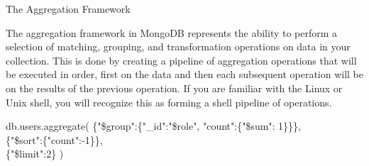 \documentclass{beamer}
\begin{document}
\begin{frame}{The Aggregation Framework}

   	The aggregation framework in MongoDB represents the ability to perform a selection of matching, grouping,
   	and transformation operations on data in your collection. This is done by creating a pipeline of aggregation
   	operations that will be executed in order, first on the data and then each subsequent operation will be on the
   	results of the previous operation. If you are familiar with the Linux or Unix shell, you will recognize this as
   	forming a shell pipeline of operations.
    \vspace{1cm}

	\scriptsize
	\begin{Alms*}
	db.users.aggregate(\NI
	\{"\$group":\{"\_id":"\$role", "count":\{"\$sum": 1\}\}\}, \\
	\{"\$sort":\{"count":-1\}\}, \\
	\{"\$limit":2\}
	\ND )
	\end{Alms*}

\end{frame}


%
%
\end{document}
